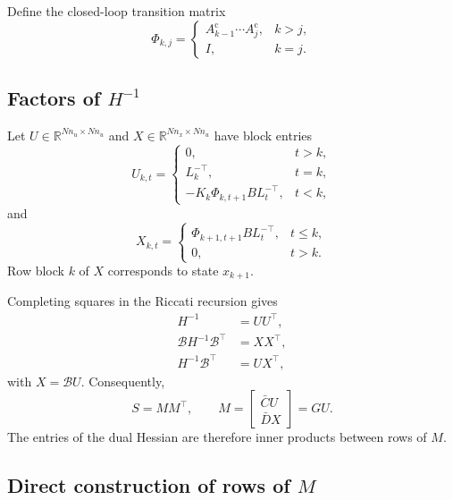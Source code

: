 \documentclass[11pt]{article}
\newcommand{\R}{\mathbb{R}}
\begin{document}
Define the closed-loop transition matrix
\[
\Phi_{k,j}=
\begin{cases}
A_{k-1}^{\mathrm c}\cdots A_j^{\mathrm c},&k>j,\\
I,&k=j.
\end{cases}
\]

\subsection{Factors of \(H^{-1}\)}

Let \(U\in\R^{Nn_u\times Nn_u}\) and
\(X\in\R^{Nn_x\times Nn_u}\) have block entries
\begin{equation}
U_{k,t}=
\begin{cases}
0,&t>k,\\
L_k^{-\top},&t=k,\\
-K_k\Phi_{k,t+1}B L_t^{-\top},&t<k,
\end{cases}
\label{eq:U-blocks}
\end{equation}
and
\begin{equation}
X_{k,t}=
\begin{cases}
\Phi_{k+1,t+1}B L_t^{-\top},&t\leq k,\\
0,&t>k.
\end{cases}
\label{eq:X-blocks}
\end{equation}
Row block \(k\) of \(X\) corresponds to state \(x_{k+1}\).

Completing squares in the Riccati recursion gives
\begin{equation}
\begin{aligned}
H^{-1}&=UU^\top,\\
\mathcal B H^{-1}\mathcal B^\top&=XX^\top,\\
H^{-1}\mathcal B^\top&=UX^\top,
\end{aligned}
\label{eq:inverse-factorizations}
\end{equation}
with \(X=\mathcal B U\). Consequently,
\begin{equation}
S=MM^\top,\qquad
M=
\begin{bmatrix}
\bar C U\\
\bar D X
\end{bmatrix}
=GU.
\label{eq:dual-gram-factor}
\end{equation}
The entries of the dual Hessian are therefore inner products between
rows of \(M\).

\subsection{Direct construction of rows of \(M\)}
\end{document}
